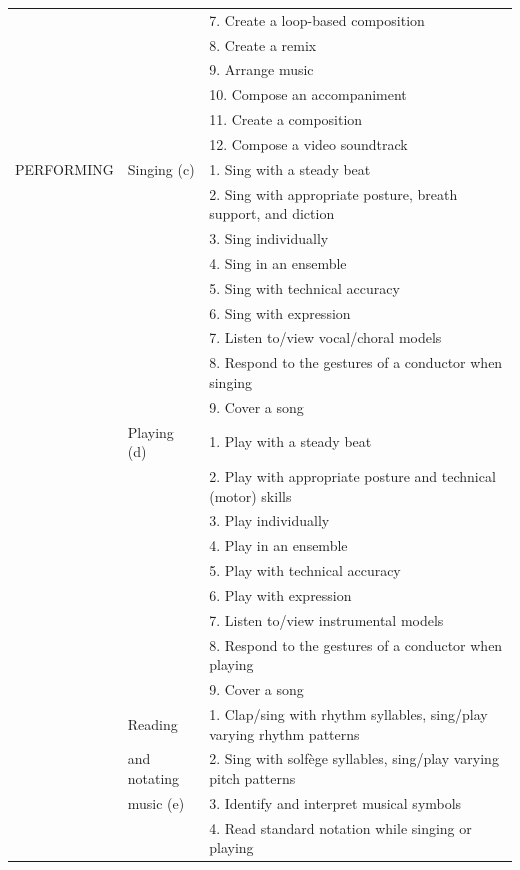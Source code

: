 \documentclass[10pt,journal,compsoc]{IEEEtran}
\begin{document}
\begin{table}[htbp]
\begin{tabular}{p{}p{}p{}}
		& & 7. Create a loop-based composition\\
		& & 8. Create a remix\\
		& & 9. Arrange music\\
		& & 10. Compose an accompaniment\\
		& & 11. Create a composition\\
		& & 12. Compose a video soundtrack\\
		\hline\noalign{\smallskip}
		PERFORMING & Singing (c)& 1. Sing with a steady beat\\
		& & 2. Sing with appropriate posture, breath support, and diction\\
		& & 3. Sing individually\\
		& & 4. Sing in an ensemble\\
		& & 5. Sing with technical accuracy\\
		& & 6. Sing with expression\\
		& & 7. Listen to/view vocal/choral models\\
		& & 8. Respond to the gestures of a conductor when singing\\
		& & 9. Cover a song\\
		
		\cline{2-3}
		
		& Playing (d)& 1. Play with a steady beat\\
		& & 2. Play with appropriate posture and technical (motor) skills\\
		& & 3. Play individually\\
		& & 4. Play in an ensemble\\
		& & 5. Play with technical accuracy\\
		& & 6. Play with expression\\
		
		& & 7. Listen to/view instrumental models\\
		& & 8. Respond to the gestures of a conductor when playing\\
		& & 9. Cover a song\\
		
		\cline{2-3}
		
		&  Reading & 1. Clap/sing with rhythm syllables, sing/play varying rhythm patterns\\
		& and notating & 2. Sing with solf\`{e}ge syllables, sing/play varying pitch patterns\\
		& music (e) & 3. Identify and interpret musical symbols\\
		&  & 4. Read standard notation while singing or playing\\
		

\end{tabular}
\end{table}
\end{document}
